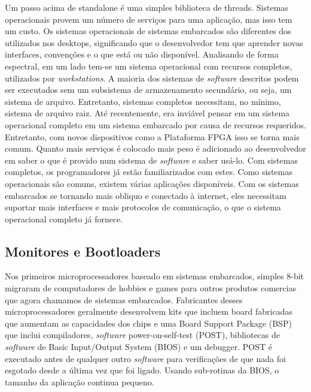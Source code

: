 Um passo acima de standalone é uma simples biblioteca de threads. Sistemas operacionais provem um número de serviços para uma aplicação, mas isso tem um custo. Os sistemas operacionais de sistemas embarcados são diferentes dos utilizados nos desktops, significando que o desenvolvedor tem que aprender novas interfaces, convenções e o que está ou não disponível. Analisando de forma espectral, em um lado tem-se um sistema operacional com recursos completos, utilizados por \textit{\textit{workstation}s}. A maioria dos sistemas de \textit{software} descritos podem ser executados sem um subsistema de armazenamento secundário, ou seja, um sistema de arquivo. Entretanto, sistemas completos necessitam, no mínimo, sistema de arquivo raiz. Até recentemente, era inviável pensar em um sistema operacional completo em um sistema embarcado por causa de recursos requeridos. Entretanto, com novos dispositivos como a Plataforma FPGA isso se torna mais comum. Quanto mais serviços é colocado mais peso é adicionado ao desenvolvedor em saber o que é provido num sistema de \textit{software} e saber usá-lo. Com sistemas completos, os programadores já estão familiarizados com estes. Como sistemas operacionais são comuns, existem várias aplicações disponíveis. Com os sistemas embarcados se tornando mais obliquo e conectado à internet, eles necessitam suportar mais interfaces e mais protocolos de comunicação, o que o sistema operacional completo já fornece.


\subsection{Monitores e Bootloaders}

Nos primeiros microprocessadores baseado em sistemas embarcados, simples 8-bit migraram de computadores de hobbies e games para outros produtos comercias que agora chamamos de sistemas embarcados. Fabricantes desses microprocessadores geralmente desenvolvem kits que incluem board fabricadas que aumentam as capacidades dos chips e uma Board Support Package (BSP) que inclui compiladores, \textit{software} power-on-self-test (POST), bibliotecas de \textit{software} de Basic Input/Output System (BIOS) e um debugger. POST é executado antes de qualquer outro \textit{software} para verificações de que nada foi esgotado desde a última vez que foi ligado. Usando sub-rotinas da BIOS, o tamanho da aplicação continua pequeno.

